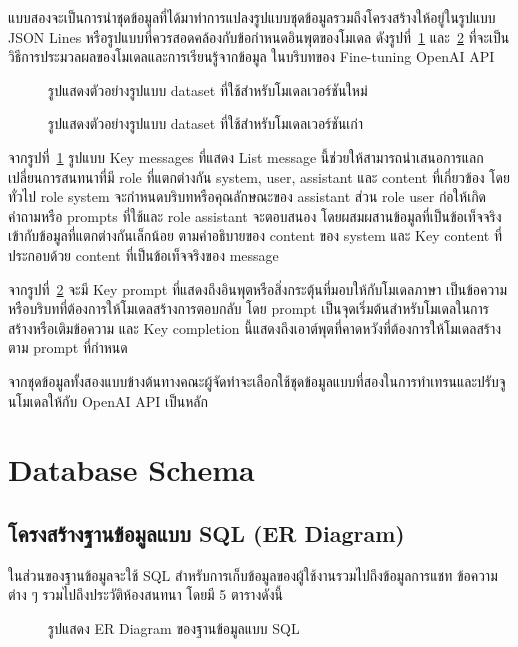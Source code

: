 \documentclass[12pt,oneside,openright,a4paper]{cpe-thai-project}
\begin{document}
แบบสองจะเป็นการนำชุดข้อมูลที่ได้มาทำการแปลงรูปแบบชุดข้อมูลรวมถึงโครงสร้างให้อยู่ในรูปแบบ JSON Lines หรือรูปแบบที่ควรสอดคล้องกับข้อกำหนดอินพุตของโมเดล ดังรูปที่~\ref{fig:F3.18} และ~\ref{fig:F3.19} ที่จะเป็นวิธีการประมวลผลของโมเดลและการเรียนรู้จากข้อมูล ในบริบทของ Fine-tuning OpenAI API \\

\begin{figure}[!h]\centering
\setlength{\fboxrule}{0mm}
\caption{รูปแสดงตัวอย่างรูปแบบ dataset ที่ใช้สำหรับโมเดลเวอร์ชันใหม่}\label{fig:F3.18}
\end{figure}

\begin{figure}[!h]\centering
\setlength{\fboxrule}{0mm}
\caption{รูปแสดงตัวอย่างรูปแบบ dataset ที่ใช้สำหรับโมเดลเวอร์ชันเก่า}\label{fig:F3.19}
\end{figure}

จากรูปที่~\ref{fig:F3.18} รูปแบบ Key messages ที่แสดง List message นี้ช่วยให้สามารถนำเสนอการแลกเปลี่ยนการสนทนาที่มี role ที่แตกต่างกัน system, user, assistant และ content ที่เกี่ยวข้อง โดยทั่วไป role system จะกำหนดบริบทหรือคุณลักษณะของ assistant ส่วน role user ก่อให้เกิดคำถามหรือ prompts ที่ใช้และ role assistant จะตอบสนอง โดยผสมผสานข้อมูลที่เป็นข้อเท็จจริงเข้ากับข้อมูลที่แตกต่างกันเล็กน้อย ตามคำอธิบายของ content ของ system และ Key content ที่ประกอบด้วย content ที่เป็นข้อเท็จจริงของ message

จากรูปที่~\ref{fig:F3.19} จะมี Key prompt ที่แสดงถึงอินพุตหรือสิ่งกระตุ้นที่มอบให้กับโมเดลภาษา เป็นข้อความหรือบริบทที่ต้องการให้โมเดลสร้างการตอบกลับ โดย prompt เป็นจุดเริ่มต้นสำหรับโมเดลในการสร้างหรือเติมข้อความ และ Key completion นี้แสดงถึงเอาต์พุตที่คาดหวังที่ต้องการให้โมเดลสร้างตาม prompt ที่กำหนด

จากชุดข้อมูลทั้งสองแบบข้างต้นทางคณะผู้จัดทำจะเลือกใช้ชุดข้อมูลแบบที่สองในการทำเทรนและปรับจูนโมเดลให้กับ OpenAI API เป็นหลัก \newpage

\section{Database Schema}
\subsection{โครงสร้างฐานข้อมูลแบบ SQL (ER Diagram)}
ในส่วนของฐานข้อมูลจะใช้ SQL สำหรับการเก็บข้อมูลของผู้ใช้งานรวมไปถึงข้อมูลการแชท ข้อความต่าง ๆ รวมไปถึงประวัติห้องสนทนา โดยมี 5 ตารางดังนี้
\begin{figure}[!h]\centering
\setlength{\fboxrule}{0.1mm}
\caption{รูปแสดง ER Diagram ของฐานข้อมูลแบบ SQL}\label{fig:F3.20}
\end{figure} \newpage
\end{document}

